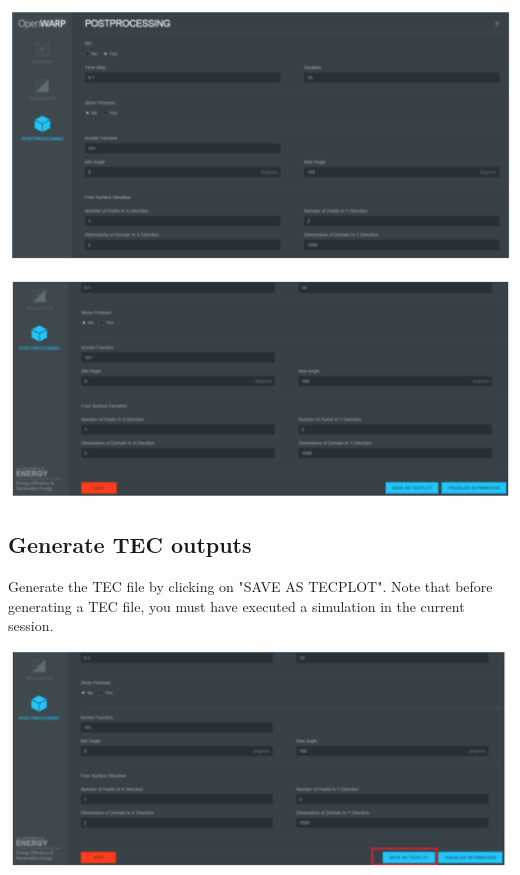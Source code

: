 \documentclass[12pt]{article}
\begin{document}
\vspace{\abovedisplayskip}
\begin{minipage}{\linewidth}
	\centering
	\includegraphics[scale=0.4]{img/34}
\end{minipage}
\begin{minipage}{\linewidth}
	\centering
	\includegraphics[scale=0.4]{img/35}
\end{minipage}



\subsection{Generate TEC outputs}

Generate the TEC file by clicking on "SAVE AS TECPLOT". Note that before generating a TEC file, you must have executed a simulation in the current session.

\vspace{\abovedisplayskip}
\begin{minipage}{\linewidth}
	\centering
	\includegraphics[scale=0.4]{img/36}
\end{minipage}
\vspace{\belowdisplayskip}
\end{document}

